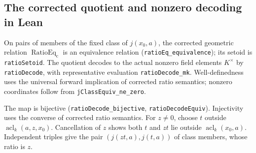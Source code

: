 \documentclass[11pt,oneside]{article}
\theoremstyle{definition}
\theoremstyle{remark}
\newcommand{\acl}{\operatorname{acl}}
\newcommand{\lean}[1]{\nolinkurl{#1}}
\begin{document}
\subsection{The corrected quotient and nonzero decoding in Lean}

On pairs of members of the fixed class of $j(x_0,a)$, the corrected geometric
relation $\operatorname{RatioEq}_{\mathrm c}$ is an equivalence relation
(\lean{ratioEq_equivalence}); its setoid is \lean{ratioSetoid}.
The quotient decodes to the actual nonzero field elements $K^\times$ by
\lean{ratioDecode}, with representative evaluation \lean{ratioDecode_mk}.
Well-definedness uses the universal forward implication of corrected ratio
semantics; nonzero coordinates follow from \lean{jClassEquiv_ne_zero}.

The map is bijective (\lean{ratioDecode_bijective}, \lean{ratioDecodeEquiv}).
Injectivity uses the converse of corrected ratio semantics. For $z\ne0$,
choose $t$ outside $\acl_k(a,z,x_0)$. Cancellation of $z$ shows both $t$ and
$zt$ lie outside $\acl_k(x_0,a)$. Independent triples give the pair
$(j(zt,a),j(t,a))$ of class members, whose ratio is $z$.
\end{document}
